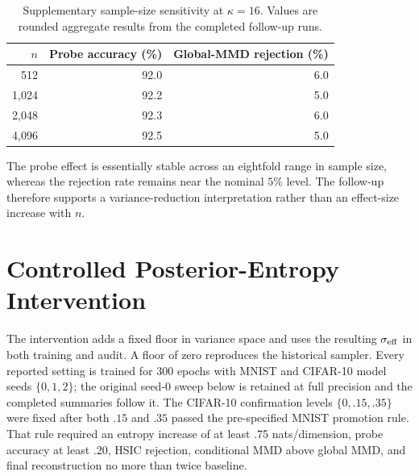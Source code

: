 \begin{table}[ht]
\caption{Supplementary sample-size sensitivity at $\kappa=16$.  Values are
rounded aggregate results from the completed follow-up runs.}
\label{tab:synthetic-n}
\centering
\small
\begin{tabular}{rrr}
\toprule
$n$ & Probe accuracy (\%) & Global-MMD rejection (\%) \\
\midrule
512  & 92.0 & 6.0 \\
1,024 & 92.2 & 5.0 \\
2,048 & 92.3 & 6.0 \\
4,096 & 92.5 & 5.0 \\
\bottomrule
\end{tabular}
\end{table}

The probe effect is essentially stable across an eightfold range in sample
size, whereas the rejection rate remains near the nominal $5\%$ level.  The
follow-up therefore supports a variance-reduction interpretation rather than
an effect-size increase with $n$.

\section{Controlled Posterior-Entropy Intervention}
\label{app:entropy}

The intervention adds a fixed floor in variance space and uses the resulting
$\sigma_{\rm eff}$ in both training and audit.  A floor of zero reproduces the
historical sampler.  Every reported setting is trained for 300 epochs with
MNIST and CIFAR-10 model seeds $\{0,1,2\}$; the original seed-0 sweep below is
retained at full precision and the completed summaries follow it.  The CIFAR-10 confirmation
levels $\{0,.15,.35\}$ were fixed after both $.15$ and $.35$ passed the
pre-specified MNIST promotion rule.  That rule required an entropy increase of
at least .75 nats/dimension, probe accuracy at least .20, HSIC rejection,
conditional MMD above global MMD, and final reconstruction no more than twice
baseline.

